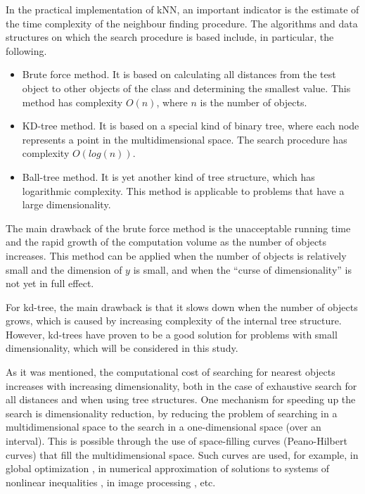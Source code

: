 \documentclass[entropy,article,submit,moreauthors,pdftex]{Definitions/mdpi}
\begin{document}
In the practical implementation of kNN, an important indicator is the estimate of the time complexity of the neighbour finding procedure. The algorithms and data structures on which the search procedure is based include, in particular, the following.


\begin{itemize}
\item Brute force method. It is based on calculating all distances from the test object to other objects of the class and determining the smallest value. This method has complexity $O(n)$, where $n$ is the number of objects.
\item KD-tree method. It is based on a special kind of binary tree, where each node represents a point in the multidimensional space. The search procedure has complexity $O(log(n))$.
\item Ball-tree method. It is yet another kind of tree structure, which has logarithmic complexity. This method is applicable to problems that have a large dimensionality.
\end{itemize}

The main drawback of the brute force method is the unacceptable running time and the rapid growth of the computation volume as the number of objects increases. This method can be applied when the number of objects is relatively small and the dimension of $y$ is small, and when the ``curse of dimensionality'' is not yet in full effect.

For kd-tree, the main drawback is that it slows down when the number of objects grows, which is caused by increasing complexity of the internal tree structure. However, kd-trees have proven to be a good solution for problems with small dimensionality, which will be considered in this study.

As it was mentioned, the computational cost of searching for nearest objects increases with increasing dimensionality, both in the case of exhaustive search for all distances and when using tree structures. One mechanism for speeding up the search is dimensionality reduction, by reducing the problem of searching in a multidimensional space to the search in a one-dimensional space (over an interval). This is possible through the use of space-filling curves (Peano-Hilbert curves) that fill the multidimensional space. Such curves are used, for example, in global optimization \cite{Lera2015,Lera2018,Strongin2018,Gergel2021}, in numerical approximation of solutions to systems of nonlinear inequalities \cite{Lera2021}, in image processing \cite{Liang2008,Costa2012,Herrero2015}, etc.
\end{document}
